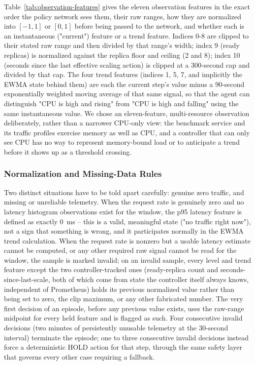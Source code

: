 Table~\ref{tab:observation-features} gives the eleven observation features
in the exact order the policy network sees them, their raw ranges, how they
are normalized into $[-1,1]$ or $[0,1]$ before being passed to the network,
and whether each is an instantaneous ("current") feature or a trend
feature. Indices 0-8 are clipped to their stated raw range and then divided
by that range's width; index 9 (ready replicas) is normalized against the
replica floor and ceiling (2 and 8); index 10 (seconds since the last
effective scaling action) is clipped at a 300-second cap and divided by
that cap. The four trend features (indices 1, 5, 7, and implicitly the
EWMA state behind them) are each the current step's value minus a
90-second exponentially weighted moving average of that same signal, so
that the agent can distinguish "CPU is high and rising" from "CPU is high
and falling" using the same instantaneous value. We chose an
eleven-feature, multi-resource observation deliberately, rather than a
narrower CPU-only view: the benchmark service and its traffic profiles
exercise memory as well as CPU, and a controller that can only see CPU has
no way to represent memory-bound load or to anticipate a trend before it
shows up as a threshold crossing.

\begin{table}[H]
\centering
\caption[Observation features]{The eleven observation features, in network input order.}
\label{tab:observation-features}
\small

\end{table}

\subsubsection{Normalization and Missing-Data Rules}
\label{sec:invalid-telemetry}

Two distinct situations have to be told apart carefully: genuine zero
traffic, and missing or unreliable telemetry. When the request rate is
genuinely zero and no latency histogram observations exist for the window,
the p95 latency feature is defined as exactly 0~ms -- this is a valid,
meaningful state ("no traffic right now"), not a sign that something is
wrong, and it participates normally in the EWMA trend calculation. When the
request rate is nonzero but a usable latency estimate cannot be computed, or
any other required raw signal cannot be read for the window, the sample is
marked invalid; on an invalid sample, every level and trend feature except
the two controller-tracked ones (ready-replica count and
seconds-since-last-scale, both of which come from state the controller
itself always knows, independent of Prometheus) holds its previous
normalized value rather than being set to zero, the clip maximum, or any
other fabricated number. The very first decision of an episode, before any
previous value exists, uses the raw-range midpoint for every held feature
and is flagged as such. Four consecutive invalid decisions (two minutes of
persistently unusable telemetry at the 30-second interval) terminate the
episode; one to three consecutive invalid decisions instead force a
deterministic HOLD action for that step, through the same safety layer that
governs every other case requiring a fallback.

